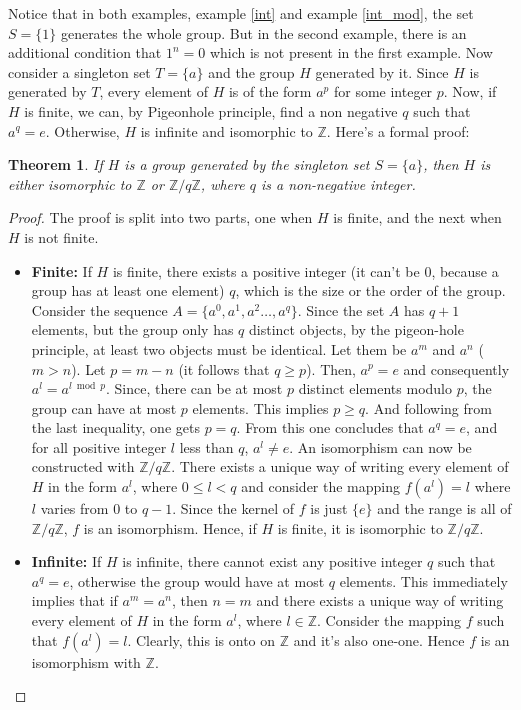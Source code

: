 \documentclass[12pt, titlepage]{article}
\newtheorem{thm}{Theorem}[section]
\theoremstyle{definition}
\begin{document}
Notice that in both examples, example \autoref{int} and example \autoref{int_mod}, the set $S = \{1\}$ generates the whole group. But in the second example, there is an additional condition that $1^n=0$ which is not present in the first example. Now consider a singleton set $T = \{a\}$ and the group $H$ generated by it. Since $H$ is generated by $T$, every element of $H$ is of the form $a^p$ for some integer $p$. Now, if $H$ is finite, we can, by Pigeonhole principle, find a non negative $q$ such that $a^q=e$. Otherwise, $H$ is infinite and isomorphic to $\mathbb{Z}$. Here's a formal proof:

\begin{thm}
\label{class1}
If $H$ is a group generated by the singleton set $S = \{a\}$, then $H$ is either isomorphic to $\mathbb{Z}$ or $\mathbb{Z}/q\mathbb{Z}$, where $q$ is a non-negative integer.
\end{thm}

\begin{proof}
The proof is split into two parts, one when $H$ is finite, and the next when $H$ is not finite.
\begin{itemize}
\item \textbf{Finite:} If $H$ is finite, there exists a positive integer (it can't be $0$, because a group has at least one element) $q$, which is the size or the order of the group. Consider the sequence $A = \{a^0, a^1, a^2 \ldots , a^q\}$. Since the set $A$ has $q+1$ elements, but the group only has $q$ distinct objects, by the pigeon-hole principle, at least two objects must be identical. Let them be $a^m$ and $a^n$ ($m>n$). Let $p=m-n$ (it follows that $q \geq p$). Then, $a^p=e$ and consequently $a^l = a^{l \bmod p}$. Since, there can be at most $p$ distinct elements modulo $p$, the group can have at most $p$ elements. This implies $p \geq q$. And following from the last inequality, one gets $p=q$. From this one concludes that $a^q=e$, and for all positive integer $l$ less than $q$, $a^l \neq e$. An isomorphism can now be constructed with $\mathbb{Z}/q\mathbb{Z}$. There exists a unique way of writing every element of $H$ in the form $a^l$, where $0 \leq l < q$ and consider the mapping $f(a^l) = l$ where $l$ varies from $0$ to $q-1$. Since the kernel of $f$ is just $\{e\}$ and the range is all of $\mathbb{Z}/q\mathbb{Z}$, $f$ is an isomorphism. Hence, if $H$ is finite, it is isomorphic to $\mathbb{Z}/q\mathbb{Z}$.

\item \textbf{Infinite:} If $H$ is infinite, there cannot exist any positive integer $q$ such that $a^q=e$, otherwise the group would have at most $q$ elements. This immediately implies that if $a^m = a^n$, then $n=m$ and there exists a unique way of writing every element of $H$ in the form $a^l$, where $l \in \mathbb{Z}$. Consider the mapping $f$ such that $f(a^l)=l$. Clearly, this is onto on $\mathbb{Z}$ and it's also one-one. Hence $f$ is an isomorphism with $\mathbb{Z}$.
\end{itemize}
\end{proof}
\end{document}
